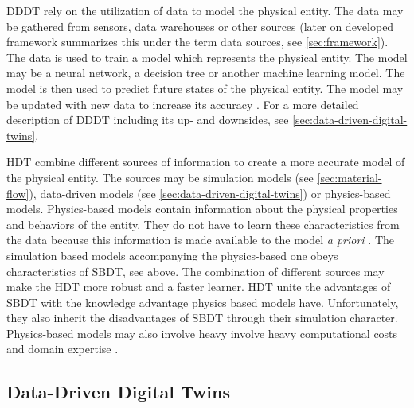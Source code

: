 DDDT rely on the utilization of data to model the physical entity. The data may be gathered from sensors, data warehouses or other sources (later on developed framework summarizes this under the term data sources, see \autoref{sec:framework}). The data is used to train a model which represents the physical entity. The model may be a neural network, a decision tree or another machine learning model. The model is then used to predict future states of the physical entity. The model may be updated with new data to increase its accuracy \autocite{he2019data,Friederich2022}. For a more detailed description of DDDT including its up- and downsides, see \autoref{sec:data-driven-digital-twins}.

HDT combine different sources of information to create a more accurate model of the physical entity. The sources may be simulation models (see \autoref{sec:material-flow}), data-driven models (see \autoref{sec:data-driven-digital-twins}) or physics-based models. Physics-based models contain information about the physical properties and behaviors of the entity. They do not have to learn these characteristics from the data because this information is made available to the model \textit{a priori} \autocite{kapteyn2022data,aivaliotis2019methodology}. The simulation based models accompanying the physics-based one obeys characteristics of SBDT, see above. The combination of different sources may make the HDT more robust and a faster learner. HDT unite the advantages of SBDT with the knowledge advantage physics based models have. Unfortunately, they also inherit the disadvantages of SBDT through their simulation character. Physics-based models may also involve heavy involve heavy computational costs and domain expertise \autocite{kapteyn2022data}.

\subsection{Data-Driven Digital Twins}
\label{sec:data-driven-digital-twins}

